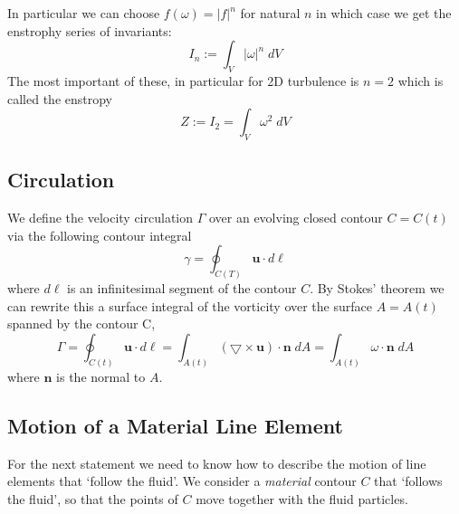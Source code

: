 \documentclass[11pt]{article}
\newcommand{\grad}{\bigtriangledown}
\newcommand{\dl}{d\ell}
\newcommand{\defeq}{:=}
\newcommand{\mv}[1]{\textbf{#1}}
\newcommand{\mdf}[1]{{\color{red}#1}}
\newcommand{\abs}[1]{|#1|}
\begin{document}
In particular we can choose $f(\omega)=\abs{f}^n$ for natural $n$ in which case we get the \mdf{enstrophy series of invariants}:
$$I_n\defeq\int_V \abs{\omega}^n\;dV$$
The most important of these, in particular for 2D turbulence is $n=2$ which is called the \mdf{enstropy}
$$Z\defeq I_2 = \int_V \omega^2\;dV$$

\subsection{Circulation}
We define the \mdf{velocity circulation} $\Gamma$ over an evolving closed contour $C=C(t)$ via the following contour integral
$$\gamma=\oint_{C(T)}\mv{u}\cdot\dl$$
where $\dl$ is an infinitesimal segment of the contour $C$.
By Stokes' theorem we can rewrite this a surface integral of the vorticity over the surface $A=A(t)$ spanned by the contour C,
$$\Gamma=\oint_{C(t)} \mv{u}\cdot\dl=\int_{A(t)}(\grad\times\mv{u})\cdot\mv{n}\;dA=\int_{A(t)}\omega\cdot\mv{n}\;dA$$
where $\mv{n}$ is the normal to $A$.
\subsection{Motion of a Material Line Element}
For the next statement we need to know how to describe the motion of line elements that `follow the fluid'. We consider a \emph{material} contour $C$ that `follows the fluid', so that the points of $C$ move together with the fluid particles.
\end{document}
